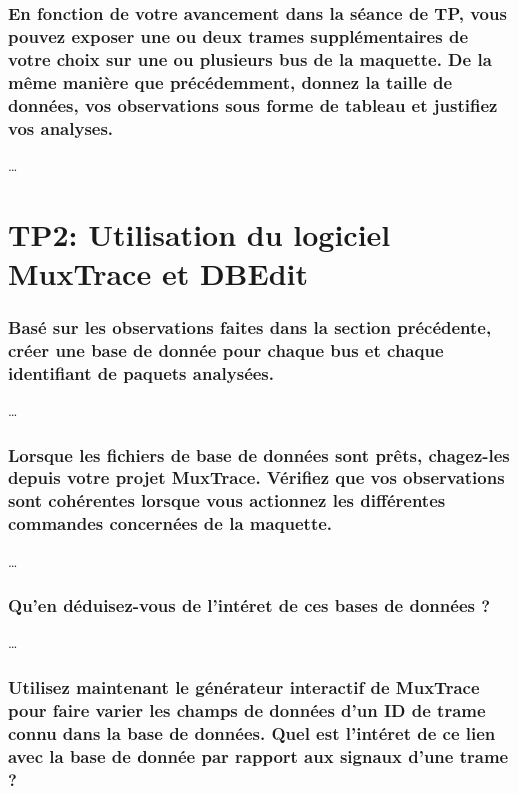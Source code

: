 \documentclass{rapportECC}
\begin{document}
\subsubsection*{En fonction de votre avancement dans la séance de TP, vous pouvez exposer une ou deux trames supplémentaires de votre choix sur une ou plusieurs bus de la maquette. De la même manière que précédemment, donnez la taille de données, vos observations sous forme de tableau et justifiez vos analyses.}

\dots


\section{TP2: Utilisation du logiciel MuxTrace et DBEdit}

\subsubsection*{Basé sur les observations faites dans la section précédente, créer une base de donnée pour chaque bus et chaque identifiant de paquets analysées.}

\dots

\subsubsection*{Lorsque les fichiers de base de données sont prêts, chagez-les depuis votre projet MuxTrace. Vérifiez que vos observations sont cohérentes lorsque vous actionnez les différentes commandes concernées de la maquette.}

\dots

\subsubsection*{Qu'en déduisez-vous de l'intéret de ces bases de données ?}

\dots

\subsubsection*{Utilisez maintenant le générateur interactif de MuxTrace pour faire varier les champs de données d'un ID de trame connu dans la base de données. Quel est l'intéret de ce lien avec la base de donnée par rapport aux signaux d'une trame ?}
\end{document}
